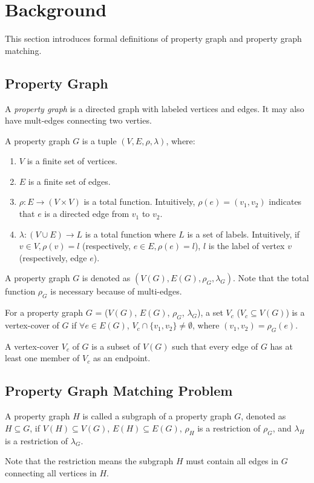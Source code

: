 \section{Background}\label{sec:background}
This section introduces formal definitions of property graph and property graph matching.
\subsection{Property Graph}
A \emph{property graph} is a directed graph with labeled vertices and edges. It may also have mult-edges connecting two verties.

\begin{definition}
  A property graph $G$ is a tuple $(V, E, \rho, \lambda)$, where:
  \begin{enumerate}[noitemsep,label={(\arabic*)}]
  \item $V$ is a finite set of vertices.
  \item $E$ is a finite set of edges.
  \item $\rho: E \rightarrow (V \times V)$ is a total function.
    Intuitively, $\rho(e) = (v_1, v_2)$ indicates that $e$ is a directed edge from $v_1$ to $v_2$.
  \item $\lambda :(V \cup E) \rightarrow L$ is a total function where $L$ is a set of labels.
    Intuitively, if $v \in V, \rho(v) = l$ (respectively, $e \in E, \rho(e) = l$),
    $l$ is the label of vertex $v$ (respectively, edge $e$).
  \end{enumerate}
\end{definition}
A property graph $G$ is denoted as $(V(G), E(G), \rho_G, \lambda_G)$.
Note that the total function $\rho_G$ is necessary because of multi-edges.

\begin{definition}
  For a property graph $G$ = ($V(G)$, $E(G)$, $\rho_G$, $\lambda_G$), a set $V_c$ ($V_c \subseteq V(G)$) is a vertex-cover of $G$
  if $\forall e \in E(G)$, $V_c \cap \{ v_1, v_2 \} \ne \emptyset$, where $(v_1, v_2) = \rho_G(e)$.
\end{definition}
A vertex-cover $V_c$ of $G$ is a subset of $V(G)$ such that every edge of $G$ has at least one member of $V_c$ as an endpoint.
\subsection{Property Graph Matching Problem}
\begin{definition}[Subgraph]
  A property graph $H$ is called a subgraph of a property graph $G$, denoted as $H \subseteq G$, if
  $V(H) \subseteq V(G)$, $E(H) \subseteq E(G)$, $\rho_H$ is a restriction of $\rho_G$, and $\lambda_H$ is a restriction of $\lambda_G$.
\end{definition}
Note that the restriction means the subgraph $H$ must contain all edges in $G$ connecting all vertices in $H$.

